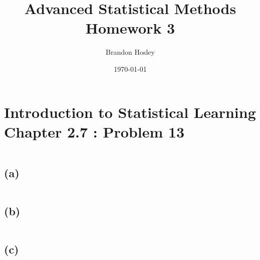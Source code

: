 \documentclass[a4paper,man,natbib]{apa6}
\title{Advanced Statistical Methods Homework 3}
\author{Brandon Hosley}
\date{\today}
\affiliation{University of Illinois - Springfield}
\begin{document}
\maketitle
\singlespacing

\section{Introduction to Statistical Learning \\ Chapter 2.7 : Problem 13}

\begin{verbatim}
\end{verbatim}

\subsection{(a)} 
\emph{ }
\begin{verbatim}
\end{verbatim}

\subsection{(b)}
\emph{ }
\begin{verbatim}
\end{verbatim}

\subsection{(c)}
\emph{ }
\begin{verbatim}
\end{verbatim}
	
\end{document}
